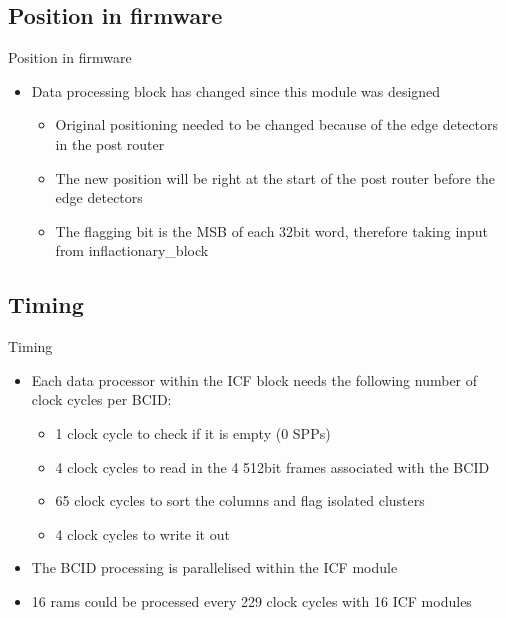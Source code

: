 \documentclass{beamer}
\begin{document}
\subsection{Position in firmware}

\begin{frame}{Position in firmware}
  \begin{itemize}
    \item
      Data processing block has changed since this module was designed
      \begin{itemize}
        \item
          Original positioning needed to be changed because of the edge detectors in the post router
        \item
          The new position will be right at the start of the post router before the edge detectors
        \item
          The flagging bit is the MSB of each 32bit word, therefore taking input from inflactionary\_block
      \end{itemize}
    \end{itemize}
\end{frame}

\subsection{Timing}

\begin{frame}{Timing}
  \begin{itemize}
    \item
      Each data processor within the ICF block needs the following number of clock cycles per BCID:
      \begin{itemize}
        \item
            1 clock cycle to check if it is empty (0 SPPs)
        \item
            4 clock cycles to read in the 4 512bit frames associated with the BCID
        \item
            65 clock cycles to sort the columns and flag isolated clusters
        \item
            4 clock cycles to write it out
      \end{itemize}
    \item
      The BCID processing is parallelised within the ICF module
    \item
      16 rams could be processed every 229 clock cycles with 16 ICF modules
  \end{itemize}
\end{frame}
\end{document}

